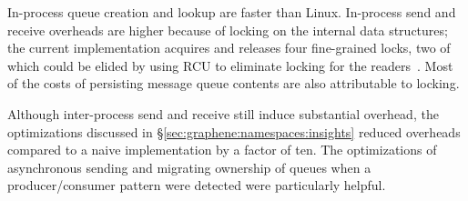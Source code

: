 In-process queue creation and lookup are faster than Linux.
In-process send and receive overheads are higher
because of locking on the internal data structures; the current implementation acquires and releases four
fine-grained locks, two of which could be elided by using RCU to eliminate locking for the readers~\citep{mckenney04rcu}.
Most of the costs of persisting message queue contents are also attributable to locking.

Although inter-process send and receive still induce substantial overhead, the optimizations
discussed in \S\ref{sec:graphene:namespaces:insights} reduced overheads compared to a naive implementation
by a factor of ten.  The optimizations of asynchronous sending and migrating ownership of queues
when a producer/consumer pattern were detected were particularly helpful.



